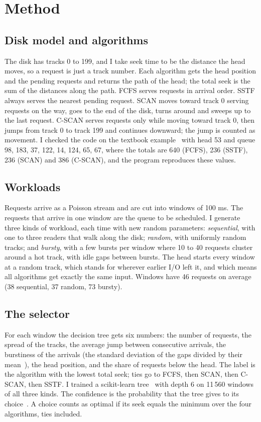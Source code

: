\documentclass[conference]{IEEEtran}
\begin{document}
\section{Method}
\subsection{Disk model and algorithms}
The disk has tracks 0 to 199, and I take seek time to be the distance the head moves, so a request is just a track number. Each algorithm gets the head position and the pending requests and returns the path of the head; the total seek is the sum of the distances along the path. FCFS serves requests in arrival order. SSTF always serves the nearest pending request. SCAN moves toward track 0 serving requests on the way, goes to the end of the disk, turns around and sweeps up to the last request. C-SCAN serves requests only while moving toward track 0, then jumps from track 0 to track 199 and continues downward; the jump is counted as movement. I checked the code on the textbook example~\cite{silberschatz} with head 53 and queue 98, 183, 37, 122, 14, 124, 65, 67, where the totals are 640 (FCFS), 236 (SSTF), 236 (SCAN) and 386 (C-SCAN), and the program reproduces these values.

\subsection{Workloads}
Requests arrive as a Poisson stream and are cut into windows of 100 ms. The requests that arrive in one window are the queue to be scheduled. I generate three kinds of workload, each time with new random parameters: \emph{sequential}, with one to three readers that walk along the disk; \emph{random}, with uniformly random tracks; and \emph{bursty}, with a few bursts per window where 10 to 40 requests cluster around a hot track, with idle gaps between bursts. The head starts every window at a random track, which stands for wherever earlier I/O left it, and which means all algorithms get exactly the same input. Windows have 46 requests on average (38 sequential, 37 random, 73 bursty).

\subsection{The selector}
For each window the decision tree gets six numbers: the number of requests, the spread of the tracks, the average jump between consecutive arrivals, the burstiness of the arrivals (the standard deviation of the gaps divided by their mean~\cite{goh08}), the head position, and the share of requests below the head. The label is the algorithm with the lowest total seek; ties go to FCFS, then SCAN, then C-SCAN, then SSTF. I trained a scikit-learn tree~\cite{sklearn} with depth 6 on 11\,560 windows of all three kinds. The confidence is the probability that the tree gives to its choice~\cite{niculescu05}. A choice counts as optimal if its seek equals the minimum over the four algorithms, ties included.
\end{document}
